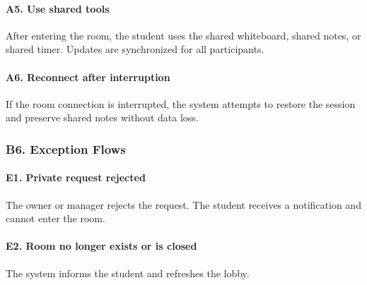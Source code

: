 \documentclass[12pt]{article}
\begin{document}
\hypertarget{sec:a5-use-shared-tools}{}
\paragraph*{A5. Use shared tools}
\par\medskip

After entering the room, the student uses the shared whiteboard, shared notes, or shared timer. Updates are synchronized for all participants.
\par\medskip

\hypertarget{sec:a6-reconnect-after-interruption}{}
\paragraph*{A6. Reconnect after interruption}
\par\medskip

If the room connection is interrupted, the system attempts to restore the session and preserve shared notes without data loss.
\par\medskip

\hypertarget{sec:b6-exception-flows}{}
\subsubsection*{B6. Exception Flows}
\par\medskip

\hypertarget{sec:e1-private-request-rejected}{}
\paragraph*{E1. Private request rejected}
\par\medskip

The owner or manager rejects the request. The student receives a notification and cannot enter the room.
\par\medskip

\hypertarget{sec:e2-room-no-longer-exists-or-is-closed}{}
\paragraph*{E2. Room no longer exists or is closed}
\par\medskip

The system informs the student and refreshes the lobby.
\par\medskip

\hypertarget{sec:e3-capacity-race-condition}{}
\end{document}
